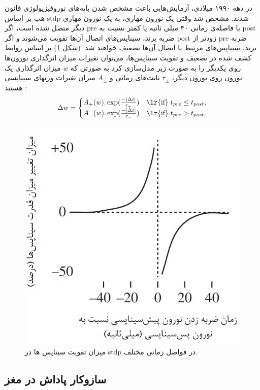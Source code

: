\documentclass[12pt]{report}
\begin{document}
	
	در دهه ۱۹۹۰ میلادی، آزمایش‌هایی باعث مشخص شدن پایه‌های نوروفیزیولوژی قانون هب بر اساس \gls{stdp} شدند.
	\cite{caporale2008spike} 
	مشخص شد وقتی یک نورون مهاری، به یک نورون مهاری دیگر متصل شده است، اگر \gls{pre} با فاصله‌ی زمانی ۴۰ میلی ثانیه یا کمتر نسبت به \gls{post} ضربه بزند، سیناپس‌های اتصال آن‌ها تقویت می‌شوند و اگر \gls{post} زودتر از \gls{pre} ضربه بزند، سیناپس‌های مرتبط با اتصال آن‌ها تضعیف خواهند شد. (شکل \ref{fig:stdp})
	بر اساس روابط کشف شده در تضعیف و تقویت سیناپس‌ها، می‌توان تغیرات میزان اثرگذاری نورون‌ها روی یکدیگر را به صورت زیر مدل‌سازی کرد به صورتی که $w$ میزان اثرگذاری یک نورون روی نورون دیگر، $\tau_\pm$ ثابت‌های زمانی  و $A_\pm$ میزان تغیرات وزنهای سیناپسی هستند
	\cite{gerstner2014neuronal}:
	\begin{align}
		\Delta w =
		\begin{cases}
			A_+(w).\exp(\frac{-|\Delta t|}{\tau_+})  & \text{\lr{if}}\; t_{pre} \leq t_{post}, \\
			A_-(w).\exp(\frac{-|\Delta t|}{\tau_-})  & \text{\lr{if}}\; t_{pre} > t_{post}.
		\end{cases}
		\label{eq:stdp}
	\end{align}
	
	
	\begin{figure}[H]
		\centering
		\includegraphics[width=0.7\linewidth]{stdp.jpg}
		\caption[NS]{
			میزان تقویت سیناپس ها در \gls{stdp} در فواصل زمانی مختلف.
		}
		\label{fig:stdp}
	\end{figure}
	
	
	\subsection{سازوکار پاداش در مغز}
	
\end{document}
